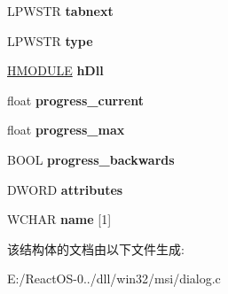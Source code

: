\begin{DoxyCompactItemize}
L\+P\+W\+S\+TR {\bfseries tabnext}
\item 
\mbox{\label{structmsi__control__tag_a260d7053e8908f0d376e42ed10a72629}} 
L\+P\+W\+S\+TR {\bfseries type}
\item 
\mbox{\label{structmsi__control__tag_a2c0de00fed93b57334f88dddba5f0eb3}} 
\hyperlink{interfacevoid}{H\+M\+O\+D\+U\+LE} {\bfseries h\+Dll}
\item 
\mbox{\label{structmsi__control__tag_a5dd24fa7056265f7b45f37afb7be7a70}} 
float {\bfseries progress\+\_\+current}
\item 
\mbox{\label{structmsi__control__tag_a06031aeb3803053fcef07871e4643a32}} 
float {\bfseries progress\+\_\+max}
\item 
\mbox{\label{structmsi__control__tag_a224ba18821b270e14506e6831b916f40}} 
B\+O\+OL {\bfseries progress\+\_\+backwards}
\item 
\mbox{\label{structmsi__control__tag_aba1efea9b9c3cb4fe54f8ba557527575}} 
D\+W\+O\+RD {\bfseries attributes}
\item 
\mbox{\label{structmsi__control__tag_a9b77f98bd4010d505b12923da07aab98}} 
W\+C\+H\+AR {\bfseries name} \mbox{[}1\mbox{]}
\end{DoxyCompactItemize}


该结构体的文档由以下文件生成\+:\begin{DoxyCompactItemize}
\item 
E\+:/\+React\+O\+S-\/0../dll/win32/msi/dialog.\+c\end{DoxyCompactItemize}
